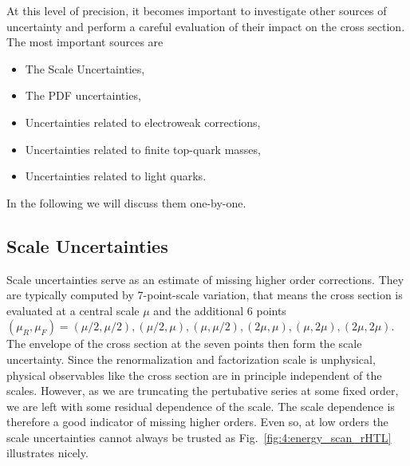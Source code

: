 At this level of precision, it becomes important to investigate other sources of uncertainty and perform a careful evaluation of their impact on the cross section. The most important sources are
\begin{itemize}
  \item The Scale Uncertainties,
  \item The \acs{PDF} uncertainties,
  \item Uncertainties related to electroweak corrections,
  \item Uncertainties related to finite top-quark masses,
  \item Uncertainties related to light quarks.
\end{itemize}
In the following we will discuss them one-by-one.

\subsection{Scale Uncertainties}
Scale uncertainties serve as an estimate of missing higher order corrections. They are typically computed by 7-point-scale variation, that means the cross section is evaluated at a central scale $\mu$ and the additional 6 points $(\mu_R, \mu_F) = (\mu/2, \mu/2), (\mu/2, \mu), (\mu, \mu/2), (2 \mu, \mu), (\mu, 2 \mu), (2 \mu, 2 \mu)$. The envelope of the cross section at the seven points then form the scale uncertainty. Since the renormalization and factorization scale is unphysical, physical observables like the cross section are in principle independent of the scales. However, as we are truncating the pertubative series at some fixed order, we are left with some residual dependence of the scale. The scale dependence is therefore a good indicator of missing higher orders. Even so, at low orders the scale uncertainties cannot always be trusted as Fig.~\ref{fig:4:energy_scan_rHTL} illustrates nicely.

